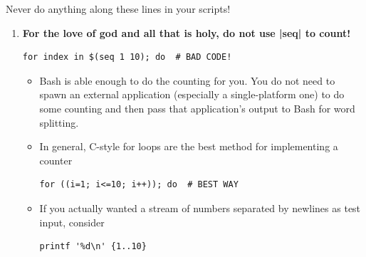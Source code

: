 \begin{frame}[fragile]{Never do anything along these lines in your scripts!}
\begin{enumerate}
\begin{lstlisting}[style=MyBash, numbers=none, aboveskip=3mm, belowskip=-6mm, xrightmargin=35mm]
                for line in $(<|+file+|); do  # BAD CODE!
            \end{lstlisting}
            \begin{itemize}
                \item command substitutions remove any trailing newlines!
            \end{itemize}
            \PrepareURLsymbol[PB]
        \item<only@4>
            \alert{\large\textbf{For the love of god and all that is holy, do not use \bash|seq| to count!}}
            \begin{lstlisting}[style=MyBash, numbers=none, aboveskip=3mm, belowskip=-6mm, xrightmargin=35mm]
                for index in $(seq 1 10); do  # BAD CODE!
            \end{lstlisting}
            \begin{itemize}
                \item Bash is able enough to do the counting for you.
                      You do not need to spawn an external application (especially a single-platform one) to do some counting and then pass that application's output to Bash for word splitting.
            \end{itemize}
            \begin{itemize}
                \item In general, C-style for loops are the best method for implementing a counter
                      \begin{lstlisting}[style=MyBash, numbers=none, aboveskip=2mm, belowskip=-5mm, xrightmargin=38mm]
                          for ((i=1; i<=10; i++)); do  # BEST WAY
                      \end{lstlisting}
                \item If you actually wanted a stream of numbers separated by newlines as test input, consider
                      \begin{lstlisting}[style=MyBash, numbers=none, aboveskip=2mm, belowskip=-5mm, xrightmargin=65mm]
                          printf '%d\n' {1..10}
                      \end{lstlisting}

\end{itemize}
\end{enumerate}
\end{frame}
